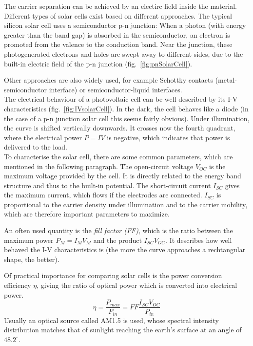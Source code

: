 The carrier separation can be achieved by an electirc field inside the material. Different types of solar cells exist based on different approaches. The typical silicon solar cell uses a semiconductor p-n junction: When a photon (with energy greater than the band gap) is absorbed in the semiconductor, an electron is promoted from the valence to the conduction band. Near the junction, these photogenerated electrons and holes are swept away to different sides, due to the built-in electric field of the p-n junction (fig.~\ref{fig:pnSolarCell}). 

Other approaches are also widely used, for example Schottky contacts (metal-semiconductor interface) or semiconductor-liquid interfaces.\\

The electrical behaviour of a photovoltaic cell can be well described by its I-V characteristics (fig.~\ref{fig:IVsolarCell}). In the dark, the cell behaves like a diode (in the case of a p-n junction solar cell this seems fairly obvious). Under illumination, the curve is shifted vertically downwards. It crosses now the fourth quadrant, where the electrical power $P=IV$ is negative, which indicates that power is delivered to the load.\\

To characterise the solar cell, there are some common parameters, which are mentioned in the following paragraph. The open-circuit voltage $V_{OC}$ is the maximum voltage provided by the cell. It is directly related to the energy band structure and thus to the built-in potential. The short-circuit current $I_{SC}$ gives the maximum current, which flows if the electrodes are connected. $I_{SC}$ is proportional to the carrier density under illumination and to the carrier mobility, which are therefore important parameters to maximize.

An often used quantity is the \textit{fill factor (FF)}, which is the ratio between the maximum power $P_M=I_M V_M$ and the product $I_{SC} V_{OC}$. It describes how well behaved the I-V characteristics is (the more the curve approaches a rechtangular shape, the better).

Of practical importance for comparing solar cells is the power conversion efficiency $\eta$, giving the ratio of optical power which is converted into electrical power. 
\[\eta = \frac{P_{max}}{P_{in}} = FF\frac{I_{SC}V_{OC}}{P_{in}}\]
Usually an optical source called AM1.5 is used, whose spectral intensity distribution matches that of sunlight reaching the earth's surface at an angle of $48.2^{\circ}$. \cite[pp.426-433]{Talapin}

